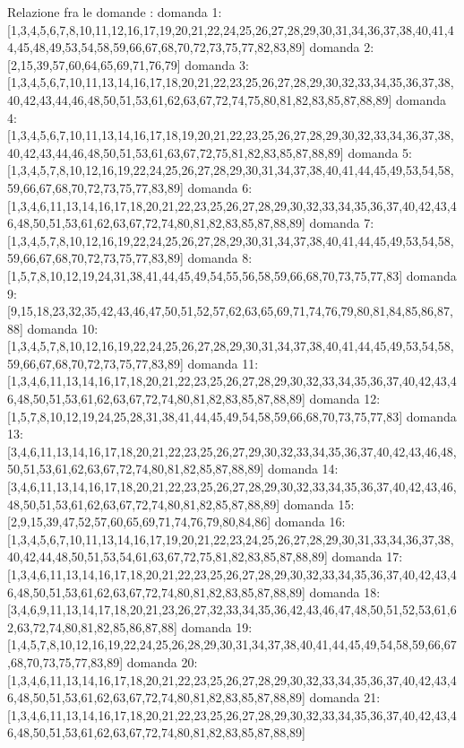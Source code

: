 Relazione fra le domande :
domanda 1:[1,3,4,5,6,7,8,10,11,12,16,17,19,20,21,22,24,25,26,27,28,29,30,31,34,36,37,38,40,41,44,45,48,49,53,54,58,59,66,67,68,70,72,73,75,77,82,83,89]
domanda 2:[2,15,39,57,60,64,65,69,71,76,79]
domanda 3:[1,3,4,5,6,7,10,11,13,14,16,17,18,20,21,22,23,25,26,27,28,29,30,32,33,34,35,36,37,38,40,42,43,44,46,48,50,51,53,61,62,63,67,72,74,75,80,81,82,83,85,87,88,89]
domanda 4:[1,3,4,5,6,7,10,11,13,14,16,17,18,19,20,21,22,23,25,26,27,28,29,30,32,33,34,36,37,38,40,42,43,44,46,48,50,51,53,61,63,67,72,75,81,82,83,85,87,88,89]
domanda 5:[1,3,4,5,7,8,10,12,16,19,22,24,25,26,27,28,29,30,31,34,37,38,40,41,44,45,49,53,54,58,59,66,67,68,70,72,73,75,77,83,89]
domanda 6:[1,3,4,6,11,13,14,16,17,18,20,21,22,23,25,26,27,28,29,30,32,33,34,35,36,37,40,42,43,46,48,50,51,53,61,62,63,67,72,74,80,81,82,83,85,87,88,89]
domanda 7:[1,3,4,5,7,8,10,12,16,19,22,24,25,26,27,28,29,30,31,34,37,38,40,41,44,45,49,53,54,58,59,66,67,68,70,72,73,75,77,83,89]
domanda 8:[1,5,7,8,10,12,19,24,31,38,41,44,45,49,54,55,56,58,59,66,68,70,73,75,77,83]
domanda 9:[9,15,18,23,32,35,42,43,46,47,50,51,52,57,62,63,65,69,71,74,76,79,80,81,84,85,86,87,88]
domanda 10:[1,3,4,5,7,8,10,12,16,19,22,24,25,26,27,28,29,30,31,34,37,38,40,41,44,45,49,53,54,58,59,66,67,68,70,72,73,75,77,83,89]
domanda 11:[1,3,4,6,11,13,14,16,17,18,20,21,22,23,25,26,27,28,29,30,32,33,34,35,36,37,40,42,43,46,48,50,51,53,61,62,63,67,72,74,80,81,82,83,85,87,88,89]
domanda 12:[1,5,7,8,10,12,19,24,25,28,31,38,41,44,45,49,54,58,59,66,68,70,73,75,77,83]
domanda 13:[3,4,6,11,13,14,16,17,18,20,21,22,23,25,26,27,29,30,32,33,34,35,36,37,40,42,43,46,48,50,51,53,61,62,63,67,72,74,80,81,82,85,87,88,89]
domanda 14:[3,4,6,11,13,14,16,17,18,20,21,22,23,25,26,27,28,29,30,32,33,34,35,36,37,40,42,43,46,48,50,51,53,61,62,63,67,72,74,80,81,82,85,87,88,89]
domanda 15:[2,9,15,39,47,52,57,60,65,69,71,74,76,79,80,84,86]
domanda 16:[1,3,4,5,6,7,10,11,13,14,16,17,19,20,21,22,23,24,25,26,27,28,29,30,31,33,34,36,37,38,40,42,44,48,50,51,53,54,61,63,67,72,75,81,82,83,85,87,88,89]
domanda 17:[1,3,4,6,11,13,14,16,17,18,20,21,22,23,25,26,27,28,29,30,32,33,34,35,36,37,40,42,43,46,48,50,51,53,61,62,63,67,72,74,80,81,82,83,85,87,88,89]
domanda 18:[3,4,6,9,11,13,14,17,18,20,21,23,26,27,32,33,34,35,36,42,43,46,47,48,50,51,52,53,61,62,63,72,74,80,81,82,85,86,87,88]
domanda 19:[1,4,5,7,8,10,12,16,19,22,24,25,26,28,29,30,31,34,37,38,40,41,44,45,49,54,58,59,66,67,68,70,73,75,77,83,89]
domanda 20:[1,3,4,6,11,13,14,16,17,18,20,21,22,23,25,26,27,28,29,30,32,33,34,35,36,37,40,42,43,46,48,50,51,53,61,62,63,67,72,74,80,81,82,83,85,87,88,89]
domanda 21:[1,3,4,6,11,13,14,16,17,18,20,21,22,23,25,26,27,28,29,30,32,33,34,35,36,37,40,42,43,46,48,50,51,53,61,62,63,67,72,74,80,81,82,83,85,87,88,89]

